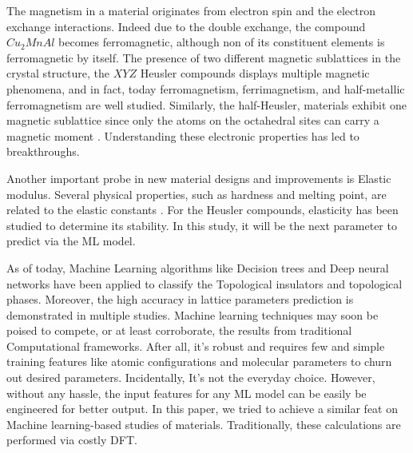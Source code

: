 \documentclass{article}
\begin{document}
The magnetism in a material originates from electron spin and the electron exchange interactions\cite{dietl2009exchange, klitzing:qhe, commins:qhe}. Indeed due to the double exchange, the compound ${Cu_2MnAl}$ becomes ferromagnetic, although non of its constituent elements is ferromagnetic by itself\cite{heusler1903magnetisch}. The presence of two different magnetic sublattices in the crystal structure, the ${XYZ}$ Heusler compounds displays multiple magnetic phenomena, and in fact, today ferromagnetism, ferrimagnetism, and half-metallic ferromagnetism are well studied. Similarly, the half-Heusler, materials exhibit one magnetic sublattice since only the atoms on the octahedral sites can carry a magnetic moment \cite{graf2013magnetic}. Understanding these electronic properties has led to breakthroughs. 

Another important probe in new material designs and improvements is Elastic modulus. Several physical properties, such as hardness and melting point, are related to the elastic constants \cite{fine1984elastic, gilman2009chemistry}. For the Heusler compounds, elasticity has been studied to determine its stability\cite{wu2017critical}. In this study, it will be the next parameter to predict via the ML model.

As of today, Machine Learning algorithms like Decision trees and Deep neural networks have been applied to classify the Topological insulators\cite{claussen2020detection, andrejevic2020machine} and topological phases\cite{ming2019quantum}. Moreover, the high accuracy in lattice parameters prediction is demonstrated in multiple studies\cite{chonghe2003prediction, jiang2006prediction, zhang2020machine}. Machine learning techniques may soon be poised to compete, or at least corroborate, the results from traditional Computational frameworks. After all, it's robust and requires few and simple training features like atomic configurations and molecular parameters to churn out desired parameters. Incidentally, It's not the everyday choice. However, without any hassle, the input features for any ML model can be easily be engineered for better output. In this paper, we tried to achieve a similar feat on Machine learning-based studies of materials. Traditionally, these calculations are performed via costly DFT.
\end{document}
